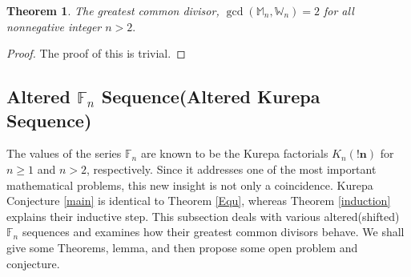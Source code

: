\documentclass[pdflatex,sn-mathphys-num]{sn-jnl}%
\newtheorem{theorem}{Theorem}
\theoremstyle{thmstyleone}%
\theoremstyle{thmstyletwo}%
\theoremstyle{thmstylethree}%
\begin{document}
\begin{theorem}
    The greatest common divisor, $\gcd(\mathbb{M}_{n}, \mathbb{W}_{n})=2$ for all nonnegative integer $n> 2.$
\end{theorem}
\begin{proof}
    The proof of this is trivial.
\end{proof}



\subsection{Altered $\mathbb{F}_{n}$ Sequence(Altered Kurepa Sequence)}

The values of the series $\mathbb{F}_{n}$ are known to be the Kurepa factorials $K_n(\mathbf{!n})$ for $n\geq1$ and $n>2$, respectively. Since it addresses one of the most important mathematical problems, this new insight is not only a coincidence.
Kurepa Conjecture \ref{main} is identical to Theorem \ref{Equ}, whereas Theorem \ref{induction} explains their inductive step. This subsection deals with various altered(shifted) $\mathbb{F}_{n}$ sequences and examines how their greatest common divisors behave. We shall give some Theorems, lemma, and then propose some open problem and conjecture.
\end{document}
